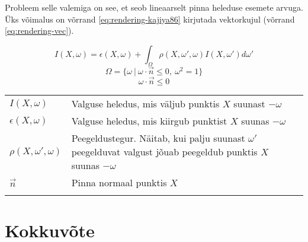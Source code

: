 \documentclass[a4paper,12pt]{report}
\begin{document}
Probleem selle valemiga on see, et seob lineaarselt pinna heleduse
esemete arvuga. Üks võimalus on võrrand \ref{eq:rendering-kajiya86}
kirjutada vektorkujul (võrrand \ref{eq:rendering-vec}).

\begin{equation} \label{eq:rendering-vec}
I(X, \omega) = \epsilon(X, \omega) + \int_\Omega\rho(X, \omega', \omega)
I(X, \omega')d\omega'
\end{equation}
\[\Omega = \{\omega ~|~ \omega\cdot \vec n \leq 0,~ \omega^2 = 1\}\]
\[\omega \cdot \vec n \leq 0\] 

\begin{tabular}{l p{}}
\(I(X, \omega)\) & Valguse heledus, mis väljub punktis \(X\) suunast
	\(-\omega\) \\
\(\epsilon(X, \omega)\) & Valguse heledus, mis kiirgub punktist \(X\) suunas
	\(-\omega\)\\
\(\rho(X, \omega', \omega)\) & Peegeldustegur. Näitab, kui palju suunast
	\(\omega'\) peegelduvat valgust jõuab peegeldub punktis \(X\) suunas
	\(-\omega\) \\
\(\vec n\) & Pinna normaal punktis \(X\) \\
 & \\
\end{tabular}



\chapter*{Kokkuvõte}

\renewcommand\bibname{Kasutatud materjalid}


\end{document}
